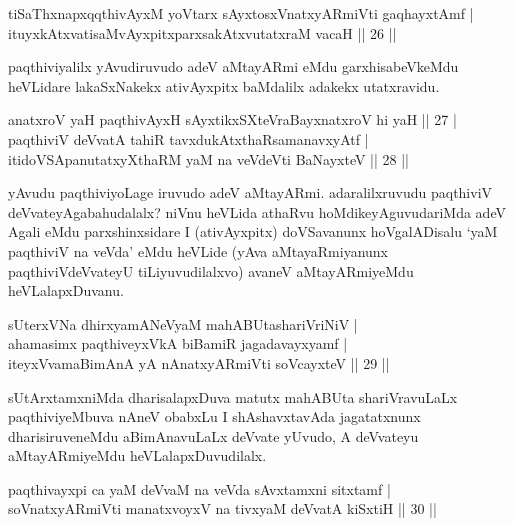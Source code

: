 \begin{shl}
tiSaThxnapxqqthivAyxM yoV\s tarx sAyxtosxV\s natxyARmiVti  gaqhayxtAmf |\\
ituyxkAtxvatisaMvAyxpitxparxsakAtxvutatxraM vacaH \hfill || 26 ||
\end{shl}

\begin{artha}
paqthiviyalilx yAvudiruvudo adeV aMtayARmi eMdu garxhisabeVkeMdu heVLidare lakaSxNakekx ativAyxpitx baMdalilx adakekx utatxravidu.
\end{artha}


\begin{shl}
anatxroV yaH paqthivAyxH sAyxtikxSXteVraBayxnatxroV hi yaH \hfill || 27 |\\
paqthiviV deVvatA tahiR tavxdukAtxthaRsamanavxyAtf |\\
itidoVSApanutatxyXthaRM yaM na veVdeVti BaNayxteV \hfill || 28 ||
\end{shl}

\begin{artha}
yAvudu paqthiviyoLage iruvudo adeV aMtayARmi. adaralilxruvudu paqthiviV deVvateyAgabahudalalx? niVnu heVLida athaRvu hoMdikeyAguvudariMda adeV Agali eMdu parxshinxsidare I (ativAyxpitx) doVSavanunx hoVgalADisalu `yaM paqthiviV na veVda' eMdu heVLide (yAva aMtayaRmiyanunx paqthiviVdeVvateyU tiLiyuvudilalxvo) avaneV aMtayARmiyeMdu heVLalapxDuvanu.
\end{artha}

\begin{shl}
sUterxVNa dhirxyamANeVyaM mahABUtashariVriNiV |\\
ahamasimx paqthiveyxVkA biBamiR jagadavayxyamf  |\\ 
iteyxVvamaBimAnA yA nAnatxyARmiVti soVcayxteV \hfill || 29 ||
\end{shl}

\begin{artha}
sUtArxtamxniMda dharisalapxDuva matutx mahABUta shariVravuLaLx paqthiviyeMbuva nAneV obabxLu I shAshavxtavAda jagatatxnunx dharisiruveneMdu aBimAnavuLaLx deVvate yUvudo, A deVvateyu aMtayARmiyeMdu heVLalapxDuvudilalx.
\end{artha}

\begin{shl}
paqthivayxpi ca yaM deVvaM na veVda sAvxtamxni sitxtamf |\\
soV\s natxyARmiVti manatxvoyxV na tivxyaM deVvatA kiSxtiH \hfill || 30 ||
\end{shl}

